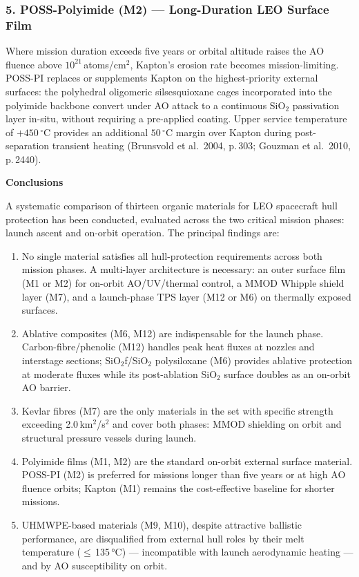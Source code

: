 \documentclass[11pt,a4paper]{article}
\newcommand{\specialsection}[1]{%
  \vspace{18pt}%
  {\fontsize{12}{14.4}\selectfont\bfseries #1\par}%
  \vspace{6pt}%
}
\begin{document}
\subsubsection*{5. POSS-Polyimide (M2) — Long-Duration LEO Surface Film}

Where mission duration exceeds five years or orbital altitude raises the AO
fluence above $10^{21}$\,atoms/cm$^{2}$, Kapton's erosion rate becomes
mission-limiting. POSS-PI replaces or supplements Kapton on the highest-priority
external surfaces: the polyhedral oligomeric silsesquioxane cages incorporated
into the polyimide backbone convert under AO attack to a continuous SiO$_{2}$
passivation layer in-situ, without requiring a pre-applied coating. Upper service
temperature of $+450\,^{\circ}$C provides an additional $50\,^{\circ}$C margin
over Kapton during post-separation transient heating (Brunsvold et al.\ 2004,
p.\,303; Gouzman et al.\ 2010, p.\,2440).

\specialsection{Conclusions}

A systematic comparison of thirteen organic materials for LEO spacecraft hull
protection has been conducted, evaluated across the two critical mission phases:
launch ascent and on-orbit operation. The principal findings are:

\begin{enumerate}[leftmargin=0.63cm, topsep=0pt, itemsep=0pt, parsep=0pt]
  \item No single material satisfies all hull-protection requirements across both
    mission phases. A multi-layer architecture is necessary: an outer surface film
    (M1 or M2) for on-orbit AO/UV/thermal control, a MMOD Whipple shield layer
    (M7), and a launch-phase TPS layer (M12 or M6) on thermally exposed surfaces.
  \item Ablative composites (M6, M12) are indispensable for the launch phase.
    Carbon-fibre/phenolic (M12) handles peak heat fluxes at nozzles and interstage
    sections; SiO$_{2}$f/SiO$_{2}$ polysiloxane (M6) provides ablative protection
    at moderate fluxes while its post-ablation SiO$_{2}$ surface doubles as an
    on-orbit AO barrier.
  \item Kevlar fibres (M7) are the only materials in the set with specific strength
    exceeding 2.0\,km$^{2}$/s$^{2}$ and cover both phases: MMOD shielding on orbit
    and structural pressure vessels during launch.
  \item Polyimide films (M1, M2) are the standard on-orbit external surface material.
    POSS-PI (M2) is preferred for missions longer than five years or at high AO
    fluence orbits; Kapton (M1) remains the cost-effective baseline for shorter
    missions.
  \item UHMWPE-based materials (M9, M10), despite attractive ballistic performance,
    are disqualified from external hull roles by their melt temperature
    ($\leq$\,135\,°C) — incompatible with launch aerodynamic heating — and by AO
    susceptibility on orbit.
\end{enumerate}
\end{document}

